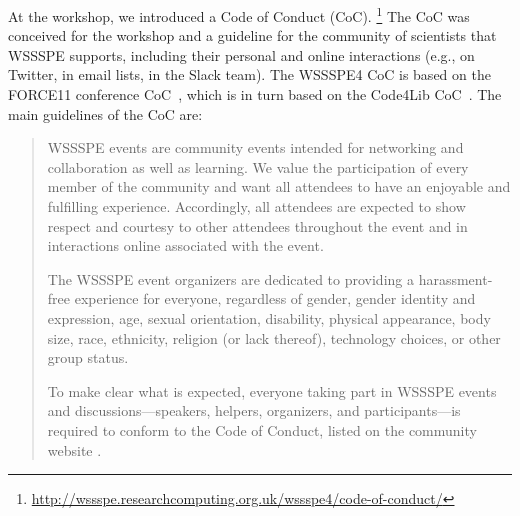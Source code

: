 \documentclass[11pt, oneside]{amsart}
\begin{document}
At the workshop, we introduced a Code of Conduct (CoC).%
\footnote{\url{http://wssspe.researchcomputing.org.uk/wssspe4/code-of-conduct/}}
The CoC was conceived for the workshop and a guideline for the community of scientists that WSSSPE
supports, including their personal and online interactions (e.g., on
Twitter, in email lists, in the Slack team). The WSSSPE4 CoC is based on the
FORCE11 conference CoC~\cite{FORCE11:CoC}, which is in turn based on the Code4Lib
CoC~\cite{Code4Lib:CoC}.
The main guidelines of the CoC are:
\begin{quote}
    WSSSPE events are community events intended for networking and collaboration
    as well as learning. We value the participation of every member of the
    community and want all attendees to have an enjoyable and fulfilling
    experience. Accordingly, all attendees are expected to show respect and
    courtesy to other attendees throughout the event and in interactions online
    associated with the event.

    The WSSSPE event organizers are dedicated to providing a harassment-free
    experience for everyone, regardless of gender, gender identity and
    expression, age, sexual orientation, disability, physical appearance,
    body size, race, ethnicity, religion (or lack thereof), technology choices,
    or other group status.

    To make clear what is expected, everyone taking part in WSSSPE events and
    discussions---speakers, helpers, organizers, and participants---is required
    to conform to the Code of Conduct, listed on the community website \cite{}.



 \end{quote}
\end{document}
